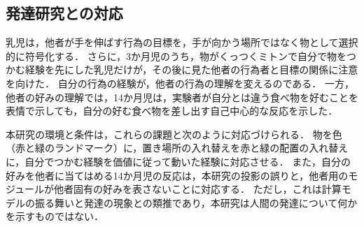 \subsection{発達研究との対応}\label{sec:related-dev}
乳児は，他者が手を伸ばす行為の目標を，手が向かう場所ではなく物として選択的に符号化する\cite{woodward1998infants}．
さらに，3か月児のうち，物がくっつくミトンで自分で物をつかむ経験を先にした乳児だけが，その後に見た他者の行為者と目標の関係に注意を向けた\cite{sommerville2005action}．
自分の行為の経験が，他者の行為の理解を変えるのである．
一方，他者の好みの理解では，14か月児は，実験者が自分とは違う食べ物を好むことを表情で示しても，自分の好む食べ物を差し出す自己中心的な反応を示した\cite{repacholi1997early}．

本研究の環境と条件は，これらの課題と次のように対応づけられる．
物を色（赤と緑のランドマーク）に，置き場所の入れ替えを赤と緑の配置の入れ替えに，自分でつかむ経験を価値に従って動いた経験に対応させる．
また，自分の好みを他者に当てはめる14か月児の反応は，本研究の投影の誤りと，他者用のモジュールが他者固有の好みを表さないことに対応する．
ただし，これは計算モデルの振る舞いと発達の現象との類推であり，本研究は人間の発達について何かを示すものではない．
